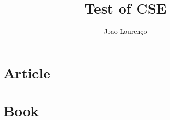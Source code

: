 \documentclass[
  a4paper, %
  11pt, %
  oneside,  %
]{scrartcl}
\title{Test of CSE}
\author{João Lourenço}
\begin{document}
  
\section{Article}
\indent
\par\cite{Asa2011}
\par\cite{Carvalho2007}
\par\cite{Duddington1955}
\par\cite{Eleftheriou2021}
\par\cite{Graham1941}
\par\cite{Kaplan2012}
\par\cite{Larsen2000}
\par\cite{Lysek1963}
\par\cite{Lysek1982}
\par\cite{Malan1997}
\par\cite{Mansfield2004}
\par\cite{Marchese2021}
\par\cite{Maurelli2014}
\par\cite{Mbaya2011}
\par\cite{Migaki1982}
\par\cite{Montali2001}
\par\cite{Moudgil2018}
\par\cite{Murphy2014}
\par\cite{Nalubamba2012}
\par\cite{Olivera2021}
\par\cite{PanayotovaPencheva2013}
\par\cite{Rabb2004}
\par\cite{Remfr1978}
\par\cite{Riadigos2014}
\par\cite{Ribes2000}
\par\cite{Rideout1987}
\par\cite{Rivero2021}
\par\cite{Saidin2018}
\par\cite{Silcox2017}
\par\cite{Strait2012}
\par\cite{Waller2001a}
\par\cite{Waller2004}
\par\cite{Williams2014}

\printbibliography[type=article, title=Article References]



\section{Book}
\indent
\par\cite{AnkelSimons2007}
\par\cite{Bogitsh2013}
\par\cite{Bowman2014}
\par\cite{Fazendeiro1989}
\par\cite{Miller2014}
\par\cite{Modry2015}
\par\cite{Modry2017}
\par\cite{Paniker2018}
\par\cite{Taylor2016}
\par\cite{Zoos2022}
\end{document}
